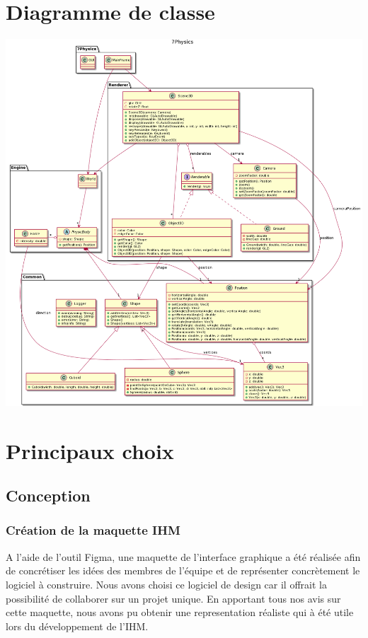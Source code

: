 \documentclass[11pt]{report}
\begin{document}
\chapter{Diagramme de classe}

\begin{center}
  \includegraphics[width=18cm]{./diagramme_classe.png}
\end{center}

\chapter{Principaux choix}

\section{Conception}

\subsection{Création de la maquette IHM}

A l'aide de l'outil Figma, une maquette de l'interface graphique a été réalisée afin de concrétiser les idées des membres de l'équipe
et de représenter concrètement le logiciel à construire. Nous avons choisi ce logiciel de design car il offrait la possibilité de
collaborer sur un projet unique. En apportant tous nos avis sur cette maquette, nous avons pu obtenir une representation réaliste qui à
été utile lors du développement de l'IHM.
\end{document}
